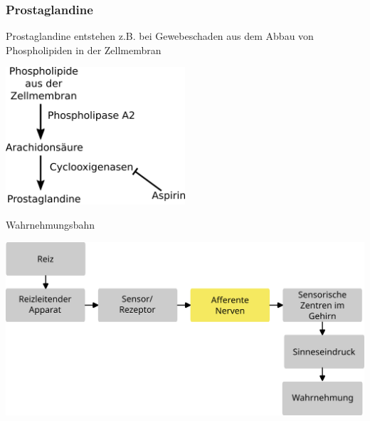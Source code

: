 \documentclass{beamer}
\begin{document}
\begin{frame}
\frametitle{Prostaglandine}

Prostaglandine entstehen z.B. bei Gewebeschaden aus dem Abbau von Phospholipiden in der Zellmembran


\begin{center}
\includegraphics[width=0.5\textwidth]{prostaglandin_synthese.png}
\end{center}



\end{frame}




\begin{frame}{Wahrnehmungsbahn}
    
    \begin{center}
        \includegraphics[width=\textwidth]{wahrnehmungsprozess_ohne_beispiel_bahnen.png}
    
    \end{center}
    
\end{frame}



\end{document}
